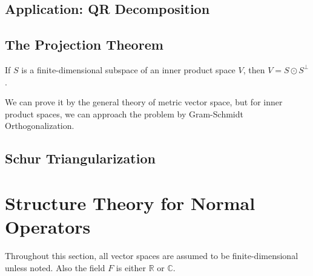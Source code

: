 \subsection{Application: QR Decomposition}
\begin{theorem}[QR decomposition]
    
\end{theorem}

\begin{theorem}
    
\end{theorem}

\subsection{The Projection Theorem}
\begin{theorem}
If $S$ is a finite-dimensional subspace of an inner product space $V$, then $V=S\odot S^\perp$.
\end{theorem}
We can prove it by the general theory of metric vector space, but for inner product spaces, we can approach the problem by Gram-Schmidt Orthogonalization.
\begin{theorem}

\end{theorem}




\subsection{Schur Triangularization}




\section{Structure Theory for Normal Operators}
Throughout this section, all vector spaces are assumed to be finite-dimensional unless noted. Also the field $F$ is either $\mathbb{R}$ or $\mathbb{C}$.
